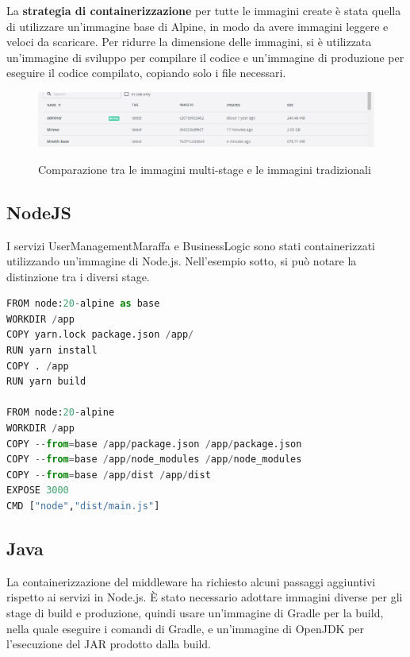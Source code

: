 La \textbf{strategia di containerizzazione} per tutte le immagini create è stata quella di utilizzare un'immagine base di Alpine, in modo da avere immagini leggere e veloci da scaricare. Per ridurre la dimensione delle immagini,
si è utilizzata un'immagine di sviluppo per compilare il codice e un'immagine di produzione per eseguire il codice compilato, copiando solo i file necessari.

\begin{figure}[H]
\caption{Comparazione tra le immagini multi-stage e le immagini tradizionali}
\centering
\includegraphics[width=12cm]{report/img/multi_stage.png}\\[10.5cm]
\end{figure}

\subsection{NodeJS}

I servizi UserManagementMaraffa e BusinessLogic sono stati containerizzati utilizzando un'immagine di Node.js. Nell'esempio sotto, si può notare la distinzione tra i diversi stage.
\vspace{1cm}

\begin{lstlisting}[language=Python, caption={Dockerfile delle immagini NodeJS}, label=list:dockerfile_nodejs]
FROM node:20-alpine as base
WORKDIR /app
COPY yarn.lock package.json /app/
RUN yarn install
COPY . /app
RUN yarn build

FROM node:20-alpine
WORKDIR /app    
COPY --from=base /app/package.json /app/package.json
COPY --from=base /app/node_modules /app/node_modules
COPY --from=base /app/dist /app/dist
EXPOSE 3000
CMD ["node","dist/main.js"]
\end{lstlisting}

\subsection{Java}

La containerizzazione del middleware ha richiesto alcuni passaggi aggiuntivi rispetto ai servizi in Node.js.
È stato necessario adottare immagini diverse per gli stage di build e produzione, quindi usare un'immagine di Gradle per la build, nella quale eseguire i comandi di Gradle, e un'immagine di 
OpenJDK per l'esecuzione del JAR prodotto dalla build.


